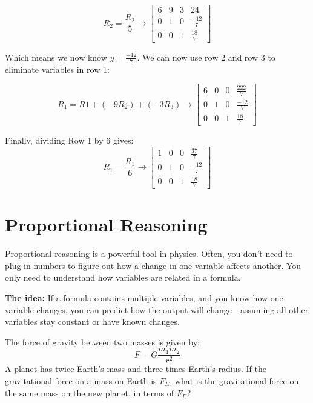 \begin{mdframed}[backgroundcolor=blue!10!white]
\begin{equation*}
	R_2 = \frac{R_2}{5}   
	\longrightarrow
	\begin{bmatrix}
		6 & 9 & 3 & 24 \\
		0 & 1 & 0 & \frac{-12}{7}\\
		0 & 0 & 1 & \frac{18}{7} 
	\end{bmatrix} 	
\end{equation*}

Which means we now know $y = \frac{-12}{7}$.  We can now use row 2 and row 3 to eliminate variables in row 1:  

\begin{equation*}
	R_1 = R1 + (-9 R_2) + (-3 R_3)  
	\longrightarrow
	\begin{bmatrix}
		6 & 0 & 0 & \frac{222}{7} \\
		0 & 1 & 0 & \frac{-12}{7}\\
		0 & 0 & 1 & \frac{18}{7} 
	\end{bmatrix} 	
\end{equation*}

Finally, dividing Row 1 by 6 gives: 
\begin{equation*}
	R_1 = \frac{R_1}{6}
	\longrightarrow
	\begin{bmatrix}
		1 & 0 & 0 & \frac{37}{7} \\
		0 & 1 & 0 & \frac{-12}{7}\\
		0 & 0 & 1 & \frac{18}{7} 
	\end{bmatrix} 	
\end{equation*}


\end{mdframed}



\newpage
\section{Proportional Reasoning} 

Proportional reasoning is a powerful tool in physics. Often, you don’t need to plug in numbers to figure out how a change in one variable affects another. You only need to understand how variables are related in a formula.

\textbf{The idea:} If a formula contains multiple variables, and you know how one variable changes, you can predict how the output will change—assuming all other variables stay constant or have known changes.


	The force of gravity between two masses is given by:
	\[
	F = G \frac{m_1 m_2}{r^2}
	\]
	A planet has twice Earth’s mass and three times Earth’s radius. If the gravitational force on a mass on Earth is \( F_E \), what is the gravitational force on the same mass on the new planet, in terms of \( F_E \)?


